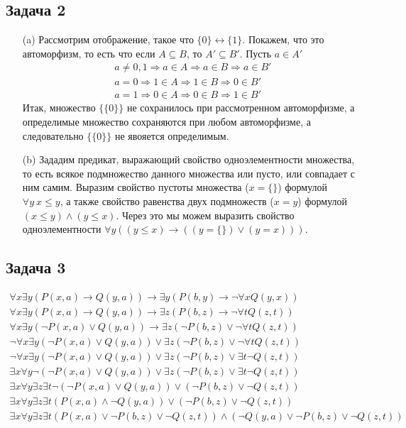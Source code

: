 \subsection*{Задача 2}
\begin{enumerate}
\item[(a)] Рассмотрим отображение, такое что $\{0\} \leftrightarrow \{1\}$. Покажем, что это автоморфизм, то есть что если $A \subseteq B$, то $A' \subseteq B'$. Пусть $a \in A'$
	\begin{gather*}
		a \ne 0,1 \Rightarrow a \in A \Rightarrow a \in B \Rightarrow a \in B'\\
		a = 0 \Rightarrow 1 \in A \Rightarrow 1 \in B \Rightarrow 0 \in B'\\
		a = 1 \Rightarrow 0 \in A \Rightarrow 0 \in B \Rightarrow 1 \in B'
	\end{gather*}
	Итак, множество $\{\{0\}\}$ не сохранилось при рассмотренном автоморфизме, а определимые множество сохраняются при любом автоморфизме, а следовательно $\{\{0\}\}$ не явояется определимым.

\item[(b)]
	Зададим предикат, выражающий свойство одноэлементности множества, то есть всякое подмножество данного множества или пусто, или совпадает с ним самим. Выразим свойство пустоты множества ($x = \{\}$) формулой $\forall y\ x \leqslant y$, а также свойство равенства двух подмножеств ($x = y$) формулой $(x \leqslant y) \wedge (y \leqslant x)$. Через это мы можем выразить свойство одноэлементности $\forall y ((y \leqslant x) \to ((y = \{\}) \vee (y = x)))$.
\end{enumerate}
\vskip 0.4in

\subsection*{Задача 3}
	\begin{gather*}
		\forall x \exists y(P(x,a) \to Q(y,a)) \to \exists y(P(b,y) \to \neg \forall x Q(y,x))\\
		\forall x \exists y(P(x,a) \to Q(y,a)) \to \exists z(P(b,z) \to \neg \forall t Q(z,t))\\
		\forall x \exists y(\neg P(x,a) \vee Q(y,a)) \to \exists z(\neg P(b,z) \vee \neg \forall t Q(z,t))\\
		\neg \forall x \exists y(\neg P(x,a) \vee Q(y,a)) \vee \exists z(\neg P(b,z) \vee \neg \forall t Q(z,t))\\
		\neg \forall x \exists y(\neg P(x,a) \vee Q(y,a)) \vee \exists z(\neg P(b,z) \vee \exists t \neg Q(z,t))\\
		\exists x \forall y \neg (\neg P(x,a) \vee Q(y,a)) \vee \exists z(\neg P(b,z) \vee \exists t \neg Q(z,t))\\
		\exists x \forall y \exists z \exists t \neg (\neg P(x,a) \vee Q(y,a)) \vee (\neg P(b,z) \vee \neg Q(z,t))\\
		\exists x \forall y \exists z \exists t (P(x,a) \wedge \neg Q(y,a)) \vee (\neg P(b,z) \vee \neg Q(z,t))\\
		\exists x \forall y \exists z \exists t (P(x,a) \vee \neg P(b,z) \vee \neg Q(z,t)) \wedge (\neg Q(y,a) \vee \neg P(b,z) \vee \neg Q(z,t))\\
	\end{gather*}
\vskip 0.4in

